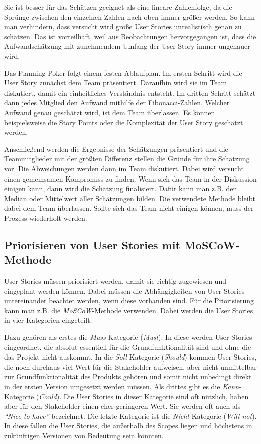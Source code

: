 \documentclass[acmtog]{acmart}
\begin{document}
Sie ist besser für das Schätzen geeignet als eine lineare Zahlenfolge, da die Sprünge zwischen den einzelnen Zahlen nach oben immer größer werden. So kann man
verhindern, dass versucht wird große User Stories unrealistisch genau zu schätzen. Das ist vorteilhaft, weil aus Beobachtungen hervorgegangen ist, dass
die Aufwandschätzung mit zunehmendem Umfang der User Story immer ungenauer wird. \cite{planingpoker}

Das Planning Poker folgt einem festen Ablaufplan. Im ersten Schritt wird die User Story zunächst dem Team präsentiert. Daraufhin wird sie im Team diskutiert,
damit ein einheitliches Verständnis entsteht. Im dritten Schritt schätzt dann jedes Mitglied den Aufwand mithilfe der Fibonacci-Zahlen. Welcher Aufwand genau
geschätzt wird, ist dem Team überlassen. Es können beispielsweise die Story Points oder die Komplexität der User Story geschätzt werden. \cite{planingpoker}

Anschließend werden die Ergebnisse der Schätzungen präsentiert und die Teammitglieder mit der größten Differenz stellen die Gründe für ihre Schätzung vor.
Die Abweichungen werden dann im Team diskutiert. Dabei wird versucht einen gemeinsamen Kompromiss zu finden. Wenn sich das Team in der Diskussion einigen kann, dann wird die Schätzung finalisiert.
Dafür kann man z.B. den Median oder Mittelwert aller Schätzungen bilden. Die verwendete Methode bleibt dabei dem Team überlassen. Sollte sich das Team nicht einigen können, muss der Prozess wiederholt werden. \cite{planingpoker}

\subsection{Priorisieren von User Stories mit MoSCoW-Methode} \label{sec:priorization}

User Stories müssen priorisiert werden, damit sie richtig zugewiesen und eingeplant werden können. Dabei müssen die Abhängigkeiten von User Stories untereinander
beachtet werden, wenn diese vorhanden sind. Für die Priorisierung kann man z.B. die \emph{MoSCoW}-Methode verwenden. Dabei werden die User Stories in vier Kategorien eingeteilt. \cite{moscow}

Dazu gehören als erstes die \emph{Muss}-Kategorie (\emph{Must}). In diese werden User Stories eingeordnet, die absolut essentiell für die Grundfunktionalität sind und ohne die das
Projekt nicht auskommt. In die \emph{Soll}-Kategorie (\emph{Should}) kommen User Stories, die noch durchaus viel Wert für die Stakeholder aufweisen, aber nicht unmittelbar zur Grundfunktionalität
des Produkts gehören und somit nicht unbedingt direkt in der ersten Version umgesetzt werden müssen. Als drittes gibt es die \emph{Kann}-Kategorie (\emph{Could}). Die User Stories in dieser Kategorie sind oft
nützlich, haben aber für den Stakeholder einen eher geringeren Wert. Sie werden oft auch als \emph{``Nice to have''} bezeichnet. Die letzte Kategorie ist die \emph{Nicht}-Kategorie
(\emph{Will not}). In diese fallen die User Stories, die außerhalb des Scopes liegen und höchstens in zukünftigen Versionen von Bedeutung sein könnten. \cite{moscow}
\end{document}
